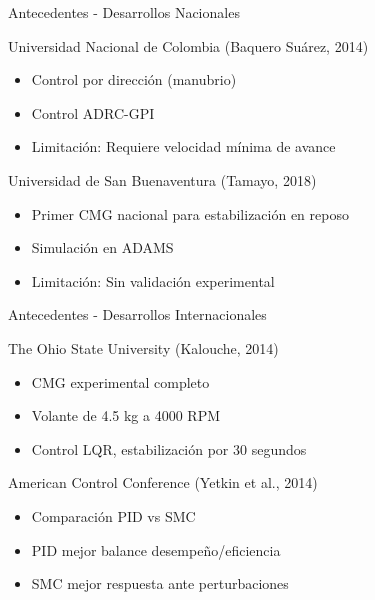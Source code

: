 \documentclass[10pt,xcolor={dvipsnames}]{beamer}
\begin{document}
\begin{frame}{Antecedentes - Desarrollos Nacionales}
\begin{block}{Universidad Nacional de Colombia (Baquero Suárez, 2014)}
\begin{itemize}
    \item Control por dirección (manubrio)
    \item Control ADRC-GPI
    \item Limitación: Requiere velocidad mínima de avance
\end{itemize}
\end{block}

\begin{block}{Universidad de San Buenaventura (Tamayo, 2018)}
\begin{itemize}
    \item Primer CMG nacional para estabilización en reposo
    \item Simulación en ADAMS
    \item Limitación: Sin validación experimental
\end{itemize}
\end{block}

\vspace{0.3cm}
\begin{center}
\end{center}
\end{frame}

\begin{frame}{Antecedentes - Desarrollos Internacionales}
\begin{block}{The Ohio State University (Kalouche, 2014)}
\begin{itemize}
    \item CMG experimental completo
    \item Volante de 4.5 kg a 4000 RPM
    \item Control LQR, estabilización por 30 segundos
\end{itemize}
\end{block}

\begin{block}{American Control Conference (Yetkin et al., 2014)}
\begin{itemize}
    \item Comparación PID vs SMC
    \item PID mejor balance desempeño/eficiencia
    \item SMC mejor respuesta ante perturbaciones
\end{itemize}
\end{block}

\vspace{0.3cm}
\begin{center}
\end{center}
\end{frame}
\end{document}
